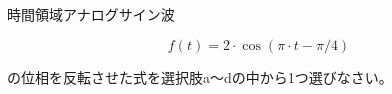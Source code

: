時間領域アナログサイン波

\[
f(t) = 2 \cdot \cos( \pi \cdot t - \pi/4 )
\]

\bigskip
\noindent  の位相を反転させた式を選択肢a〜dの中から1つ選びなさい。
